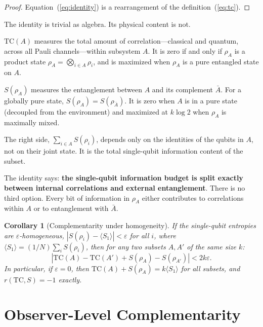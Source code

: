 \documentclass[aps,pra,twocolumn,superscriptaddress,floatfix]{revtex4-2}
\newtheorem{corollary}{Corollary}
\begin{document}
\begin{proof}
Equation~(\ref{eq:identity}) is a rearrangement
of the definition~(\ref{eq:tc}).
\end{proof}

The identity is trivial as algebra.
Its physical content is not.

$\mathrm{TC}(A)$ measures the total amount of correlation---classical
and quantum, across all Pauli channels---within subsystem $A$.
It is zero if and only if $\rho_A$ is a product state
$\rho_A = \bigotimes_{i \in A} \rho_i$, and is maximized
when $\rho_A$ is a pure entangled state on $A$.

$S(\rho_A)$ measures the entanglement between $A$ and
its complement $\bar{A}$.  For a globally pure state,
$S(\rho_A) = S(\rho_{\bar{A}})$.  It is zero when
$A$ is in a pure state (decoupled from the environment)
and maximized at $k \log 2$ when $\rho_A$ is
maximally mixed.

The right side, $\sum_{i \in A} S(\rho_i)$, depends
only on the identities of the qubits in $A$,
not on their joint state.  It is the total
single-qubit information content of the subset.

The identity says: \textbf{the single-qubit information
budget is split exactly between internal correlations
and external entanglement}.  There is no third option.
Every bit of information in $\rho_A$ either contributes
to correlations within $A$ or to entanglement with $\bar{A}$.

\begin{corollary}[Complementarity under homogeneity]
\label{cor:complementarity}
If the single-qubit entropies are $\varepsilon$-homogeneous,
$|S(\rho_i) - \langle S_1 \rangle| < \varepsilon$
for all $i$, where $\langle S_1 \rangle = (1/N)\sum_i S(\rho_i)$,
then for any two subsets $A, A'$ of the same size $k$:
\begin{equation}
|\mathrm{TC}(A) - \mathrm{TC}(A')
+ S(\rho_A) - S(\rho_{A'})| < 2k\varepsilon.
\label{eq:homogeneity}
\end{equation}
In particular, if $\varepsilon = 0$, then
$\mathrm{TC}(A) + S(\rho_A) = k \langle S_1 \rangle$
for all subsets, and
$r(\mathrm{TC}, S) = -1$ exactly.
\end{corollary}


\section{Observer-Level Complementarity}
\label{sec:observer}
\end{document}
